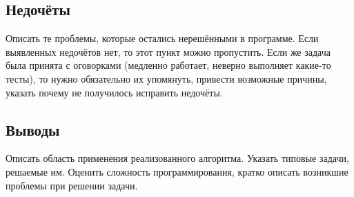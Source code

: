 \documentclass[12pt]{article}
\begin{document}
\subsection*{Недочёты}

Описать те проблемы, которые остались нерешёнными в программе. Если
выявленных недочётов нет, то этот пункт можно пропустить. Если же
задача была принята с оговорками (медленно работает, неверно выполняет
какие-то тесты), то нужно обязательно их упомянуть, привести возможные
причины, указать почему не получилось исправить недочёты. 

\subsection*{Выводы}

Описать область применения реализованного алгоритма. Указать типовые
задачи, решаемые им. Оценить сложность программирования, кратко
описать возникшие проблемы при решении задачи. 
\end{document}
